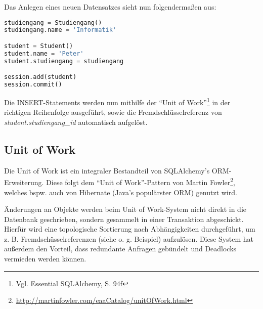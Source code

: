 \noindent
Das Anlegen eines neuen Datensatzes sieht nun folgendermaßen aus:

\begin{lstlisting}[language=Python]
studiengang = Studiengang()
studiengang.name = 'Informatik'

student = Student()
student.name = 'Peter'
student.studiengang = studiengang

session.add(student)
session.commit()
\end{lstlisting}

Die INSERT-Statements werden nun mithilfe der "`Unit of Work"'\footnote{Vgl. Essential SQLAlchemy, S. 94f} in der richtigen Reihenfolge ausgeführt, sowie die Fremdschlüsselreferenz von \textit{student.studiengang\_id} automatisch aufgelöst.

\subsection{Unit of Work}

Die Unit of Work ist ein integraler Bestandteil von SQLAlchemy’s ORM-Erweiterung. Diese folgt dem "`Unit of Work"'-Pattern von Martin Fowler\footnote{\href{http://martinfowler.com/eaaCatalog/unitOfWork.html}{http://martinfowler.com/eaaCatalog/unitOfWork.html}}, welches bspw. auch von Hibernate (Java’s populärster ORM) genutzt wird.

Änderungen an Objekte werden beim Unit of Work-System nicht direkt in die Datenbank geschrieben, sondern gesammelt in einer Transaktion abgeschickt. Hierfür wird eine topologische Sortierung nach Abhängigkeiten durchgeführt, um z. B. Fremdschüsselreferenzen (siehe o. g. Beispiel) aufzulösen. Diese System hat außerdem den Vorteil, dass redundante Anfragen gebündelt und Deadlocks vermieden werden können.
